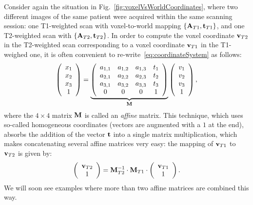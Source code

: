 \documentclass[10pt,twoside]{book}
\begin{document}
%
Consider again the situation in Fig.~\ref{fig:voxelVsWorldCoordinates}, where two different images of the same patient 
were acquired within the same scanning session: one T1-weighted scan 
with voxel-to-world mapping 
$\{\mathbf{A}_{T1},\mathbf{t}_{T1}\}$,
and one T2-weighted scan 
with 
$\{\mathbf{A}_{T2},\mathbf{t}_{T2}\}$.
In order to compute the voxel coordinate $\mathbf{v}_{T2}$ in the T2-weighted scan corresponding to a 
voxel coordinate $\mathbf{v}_{T1}$ in the T1-weighed one, it is often convenient to re-write~\eqref{eq:coordinateSystem} as follows:
\begin{equation}
\left(
\begin{array}{c}
x_1 \\
x_2 \\
x_3 \\
1
\end{array}
\right)
= 
\underbrace{
\left(
\begin{array}{cccc}
a_{1,1} & a_{1,2} & a_{1,3} & t_1 \\
a_{2,1} & a_{2,2} & a_{2,3} & t_2 \\
a_{3,1} & a_{3,2} & a_{3,3} & t_3 \\
0 & 0 & 0 & 1
\end{array}
\right)
}_{\mathbf{M}}
\left(
\begin{array}{c}
v_1 \\
v_2 \\
v_3 \\
1
\end{array}
\right)
,
\label{eq:affineMatrix}
\end{equation}
where the $4 \times 4$ matrix $\mathbf{M}$ is called an \emph{affine} matrix.
This technique, which uses so-called homogeneous coordinates (vectors are augmented with a $1$ at the end), absorbs the addition of the vector $\mathbf{t}$ into a single matrix multiplication, which makes concatenating several affine matrices very easy:  
the mapping of $\mathbf{v}_{T1}$ to $\mathbf{v}_{T2}$ is given by:
$$
\left(
\begin{array}{c}
\mathbf{v}_{T2} \\
1 
\end{array}
\right)
=
\mathbf{M}_{T2}^{-1}
\cdot
\mathbf{M}_{T1}
\cdot
\left(
\begin{array}{c}
\mathbf{v}_{T1} \\
1 
\end{array}
\right)
.
$$
%
We will soon see examples where more than two affine matrices are combined this way.
\end{document}
